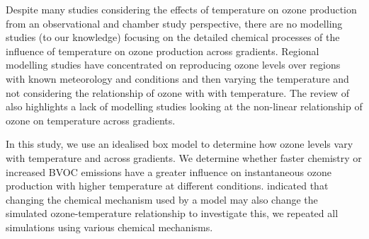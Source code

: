 Despite many studies considering the effects of temperature on ozone production from an observational and chamber study perspective, there are no modelling studies (to our knowledge) focusing on the detailed chemical processes of the influence of temperature on ozone production across  gradients.
Regional modelling studies have concentrated on reproducing ozone levels over regions with known meteorology and  conditions and then varying the temperature and not considering the relationship of ozone with  with temperature.
The review of \citet{Pusede:2015} also highlights a lack of modelling studies looking at the non-linear relationship of ozone on temperature across  gradients.

In this study, we use an idealised box model to determine how ozone levels vary with temperature and across  gradients.
We determine whether faster chemistry or increased BVOC emissions have a greater influence on instantaneous ozone production with higher temperature at different  conditions.
\citet{Rasmussen:2013} indicated that changing the chemical mechanism used by a model may also change the simulated ozone-temperature relationship to investigate this, we repeated all simulations using various chemical mechanisms.
